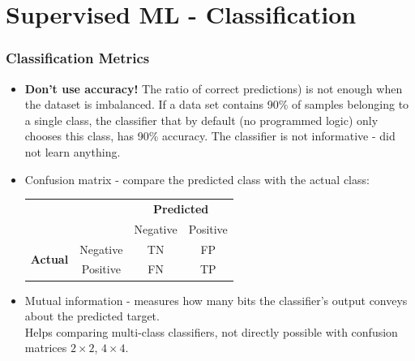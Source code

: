 \documentclass{beamer}
\begin{document}
\section{Supervised ML - Classification} 
\begin{frame}
\frametitle{Classification Metrics}

\begin{itemize}
\item \textbf{Don't use accuracy!} The ratio of correct predictions) is not enough when the dataset is imbalanced. 
If a data set contains 90\% of samples belonging to a single class, the classifier that by default (no programmed logic) only chooses this class, has 90\% accuracy.
The classifier is not informative - did not learn anything.
\item Confusion matrix - compare the predicted class with the actual class:

\begin{table}[H]
\begin{center}
\begin{tabular}{|c|c|c|c|}
\cline{3-4}
\multicolumn{2}{c|}{} & \multicolumn{2}{c|}{ \textbf{Predicted} } \\
\cline{3-4}
\multicolumn{2}{c|}{} & Negative & Positive \\
\hline
\multirow{2}{*}{\textbf{Actual}} & Negative & TN & FP \\
\cline{2-4}
& Positive & FN & TP \\
\hline
\end{tabular}
\end{center}
\end{table}

\item Mutual information - measures how many bits the classifier's output conveys about the predicted target.\\
Helps comparing multi-class classifiers, not directly possible with confusion matrices $2 \times 2$, $4 \times 4$.
\end{itemize}

\end{frame}
\end{document}
